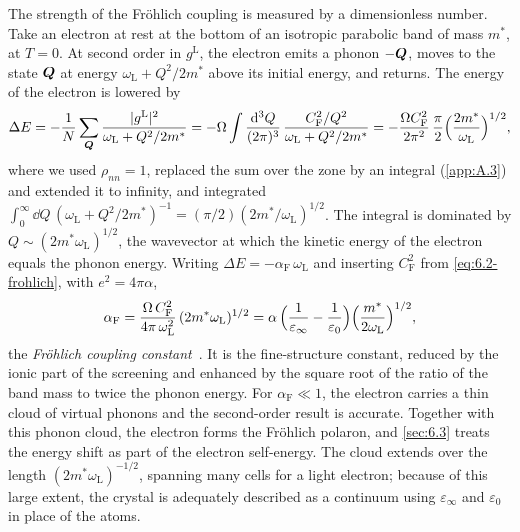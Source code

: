The strength of the Fr\"ohlich coupling is measured by a dimensionless number. Take an electron at rest at the bottom of an isotropic parabolic band of mass $m^*$, at $T = 0$. At second order in $g^{\mathrm{L}}$, the electron emits a phonon $-\bm{Q}$, moves to the state $\bm{Q}$ at energy $\omega_{\mathrm{L}} + Q^2/2m^*$ above its initial energy, and returns. The energy of the electron is lowered by
\begin{equation*}
  \Delta E = -\frac1N\sum_{\bm{Q}}\frac{|g^{\mathrm{L}}|^2}{\omega_{\mathrm{L}} + Q^2/2m^*}
  = -\Omega\int\frac{\mathrm{d}^3Q}{(2\pi)^3}\,\frac{C_{\mathrm{F}}^2/Q^2}{\omega_{\mathrm{L}} + Q^2/2m^*}
  = -\frac{\Omega C_{\mathrm{F}}^2}{2\pi^2}\,\frac{\pi}{2}\Bigl(\frac{2m^*}{\omega_{\mathrm{L}}}\Bigr)^{1/2} ,
\end{equation*}
where we used $\rho_{nn} = 1$, replaced the sum over the zone by an integral (\cref{app:A.3}) and extended it to infinity, and integrated $\int_0^\infty\dd Q\,(\omega_{\mathrm{L}} + Q^2/2m^*)^{-1} = (\pi/2)(2m^*/\omega_{\mathrm{L}})^{1/2}$. The integral is dominated by $Q \sim (2m^*\omega_{\mathrm{L}})^{1/2}$, the wavevector at which the kinetic energy of the electron equals the phonon energy. Writing $\Delta E = -\alpha_{\mathrm{F}}\,\omega_{\mathrm{L}}$ and inserting $C_{\mathrm{F}}^2$ from \cref{eq:6.2-frohlich}, with $e^2 = 4\pi\alpha$,
\begin{equation}
  \alpha_{\mathrm{F}} = \frac{\Omega\,C_{\mathrm{F}}^2}{4\pi\,\omega_{\mathrm{L}}^2}\,(2m^*\omega_{\mathrm{L}})^{1/2}
  = \alpha\,\Bigl(\frac{1}{\varepsilon_\infty} - \frac{1}{\varepsilon_0}\Bigr)\Bigl(\frac{m^*}{2\omega_{\mathrm{L}}}\Bigr)^{1/2} ,
  \label{eq:6.2-alphaF}
\end{equation}
the \emph{Fr\"ohlich coupling constant}~\cite{frohlich1954electrons}. It is the fine-structure constant, reduced by the ionic part of the screening and enhanced by the square root of the ratio of the band mass to twice the phonon energy. For $\alpha_{\mathrm{F}} \ll 1$, the electron carries a thin cloud of virtual phonons and the second-order result is accurate. Together with this phonon cloud, the electron forms the Fr\"ohlich polaron, and \cref{sec:6.3} treats the energy shift as part of the electron self-energy. The cloud extends over the length $(2m^*\omega_{\mathrm{L}})^{-1/2}$, spanning many cells for a light electron; because of this large extent, the crystal is adequately described as a continuum using $\varepsilon_\infty$ and $\varepsilon_0$ in place of the atoms.

